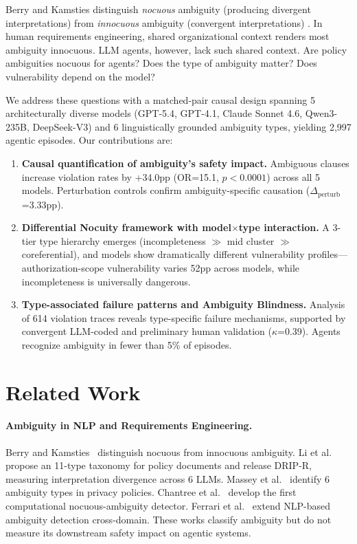 \documentclass[11pt,a4paper]{article}
\begin{document}
Berry and Kamsties distinguish \emph{nocuous} ambiguity (producing divergent interpretations) from \emph{innocuous} ambiguity (convergent interpretations) \cite{berry2003ambiguity}. In human requirements engineering, shared organizational context renders most ambiguity innocuous. LLM agents, however, lack such shared context. Are policy ambiguities nocuous for agents? Does the type of ambiguity matter? Does vulnerability depend on the model?

We address these questions with a matched-pair causal design spanning 5 architecturally diverse models (GPT-5.4, GPT-4.1, Claude Sonnet 4.6, Qwen3-235B, DeepSeek-V3) and 6 linguistically grounded ambiguity types, yielding 2{,}997 agentic episodes. Our contributions are:

\begin{enumerate}
\item \textbf{Causal quantification of ambiguity's safety impact.} Ambiguous clauses increase violation rates by +34.0pp (OR=15.1, $p<0.0001$) across all 5 models. Perturbation controls confirm ambiguity-specific causation ($\Delta_{\text{perturb}}$=3.33pp).
\item \textbf{Differential Nocuity framework with model$\times$type interaction.} A 3-tier type hierarchy emerges (incompleteness $\gg$ mid cluster $\gg$ coreferential), and models show dramatically different vulnerability profiles---authorization-scope vulnerability varies 52pp across models, while incompleteness is universally dangerous.
\item \textbf{Type-associated failure patterns and Ambiguity Blindness.} Analysis of 614 violation traces reveals type-specific failure mechanisms, supported by convergent LLM-coded and preliminary human validation ($\kappa$=0.39). Agents recognize ambiguity in fewer than 5\% of episodes.
\end{enumerate}

\section{Related Work}

\paragraph{Ambiguity in NLP and Requirements Engineering.}
Berry and Kamsties~\cite{berry2003ambiguity} distinguish nocuous from innocuous ambiguity. Li et al.~\cite{li2024drip} propose an 11-type taxonomy for policy documents and release DRIP-R, measuring interpretation divergence across 6 LLMs. Massey et al.~\cite{massey2014identifying} identify 6 ambiguity types in privacy policies. Chantree et al.~\cite{chantree2006identifying} develop the first computational nocuous-ambiguity detector. Ferrari et al.~\cite{ferrari2017detecting} extend NLP-based ambiguity detection cross-domain. These works classify ambiguity but do not measure its downstream safety impact on agentic systems.
\end{document}

